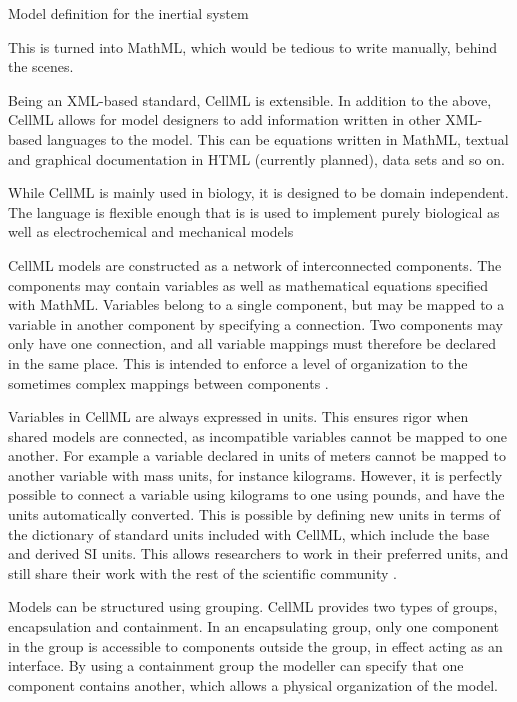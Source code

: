 \documentclass[\rootfolder/main.tex]{subfiles}
\begin{document}
\begin{listing}[ht]
    \inputminted[fontsize=\footnotesize, firstline=28]{matlab}{\rootfolder/Models/OpenCOR/Inertial.input}
    \caption{Model definition for the inertial system\label{lst:inertial-cellml-model}}
\end{listing}

This is turned into MathML, which would be tedious to write manually, behind the scenes.

Being an XML-based standard, CellML is extensible.
In addition to the above, CellML allows for model designers to add information written in other XML-based languages to the model.
This can be equations written in MathML, textual and graphical documentation in HTML (currently planned), data sets and so on.

While CellML is mainly used in biology, it is designed to be domain independent.
The language is flexible enough that is is used to implement purely biological as well as electrochemical and mechanical models \cite{cuellar2003}

CellML models are constructed as a network of interconnected components.
The components may contain variables as well as mathematical equations specified with MathML.
Variables belong to a single component, but may be mapped to a variable in another component by specifying a connection.
Two components may only have one connection, and all variable mappings must therefore be declared in the same place.
This is intended to enforce a level of organization to the sometimes complex mappings between components \cite{cuellar2003}.

Variables in CellML are always expressed in units.
This ensures rigor when shared models are connected, as incompatible variables cannot be mapped to one another.
For example a variable declared in units of meters cannot be mapped to another variable with mass units, for instance kilograms.
However, it is perfectly possible to connect a variable using kilograms to one using pounds, and have the units automatically converted.
This is possible by defining new units in terms of the dictionary of standard units included with CellML, which include the base and derived SI units.
This allows researchers to work in their preferred units, and still share their work with the rest of the scientific community \cite{cuellar2003}.

Models can be structured using grouping.
CellML provides two types of groups, encapsulation and containment.
In an encapsulating group, only one component in the group is accessible to components outside the group, in effect acting as an interface.
By using a containment group the modeller can specify that one component contains another, which allows a physical organization of the model.
\end{document}
